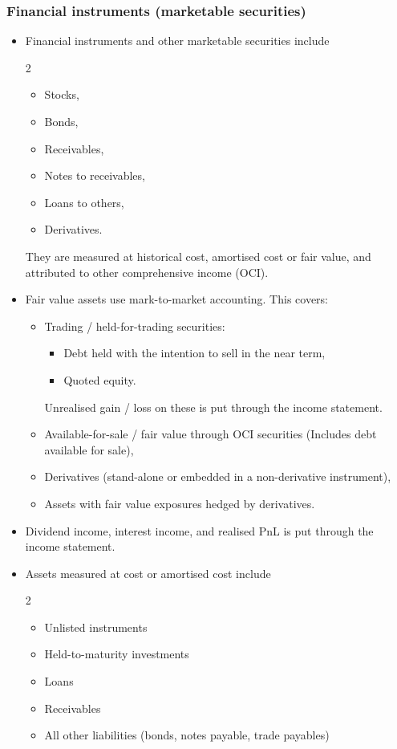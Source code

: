 \documentclass[../notes_compiled.tex]{subfiles}
\begin{document}
\subsubsection{Financial instruments (marketable securities)}
\begin{itemize}
\item Financial instruments and other marketable securities include
\begin{multicols}{2}
\begin{itemize}
\item Stocks,
\item Bonds,
\item Receivables,
\item Notes to receivables,
\item Loans to others,
\item Derivatives.
\end{itemize}
\end{multicols}
They are measured at historical cost, amortised cost or fair value, and attributed to other comprehensive income (OCI).

\item Fair value assets use mark-to-market accounting. This covers:
\begin{itemize}
\item Trading / held-for-trading securities:
\begin{itemize}
\item Debt held with the intention to sell in the near term,
\item Quoted equity.
\end{itemize}
Unrealised gain / loss on these is put through the income statement.
\item Available-for-sale / fair value through OCI securities (Includes debt available for sale),
\item Derivatives (stand-alone or embedded in a non-derivative instrument),
\item Assets with fair value exposures hedged by derivatives.
\end{itemize}
\item Dividend income, interest income, and realised PnL is put through the income statement.

\item Assets measured at cost or amortised cost include
\begin{multicols}{2}
\begin{itemize}
\item Unlisted instruments
\item Held-to-maturity investments
\item Loans
\item Receivables
\item All other liabilities (bonds, notes payable, trade payables)
\end{itemize}
\end{multicols}


\end{itemize}
\end{document}
